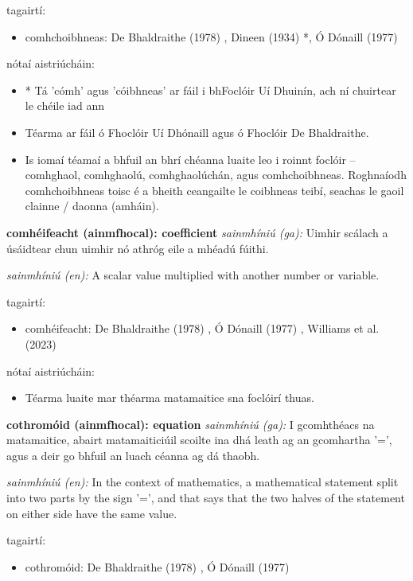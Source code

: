 \documentclass{article}
\begin{document}
tagairtí:
\begin{itemize}
	\item comhchoibhneas: De Bhaldraithe (1978) \cite{de-bhaldraithe}, Dineen (1934) \cite{dineen}*, Ó Dónaill (1977) \cite{odonaill}
\end{itemize}

nótaí aistriúcháin:
\begin{itemize}
	\item * Tá 'cómh' agus 'cóibhneas' ar fáil i bhFoclóir Uí Dhuinín, ach ní chuirtear le chéile iad ann
	\item Téarma ar fáil ó Fhoclóir Uí Dhónaill agus ó Fhoclóir De Bhaldraithe.
	\item Is iomaí téamaí a bhfuil an bhrí chéanna luaite leo i roinnt foclóir -- comhghaol, comhghaolú, comhghaolúchán, agus comhchoibhneas. Roghnaíodh comhchoibhneas toisc é a bheith ceangailte le coibhneas teibí, seachas le gaoil clainne / daonna (amháin).
\end{itemize}


\textbf{comhéifeacht (ainmfhocal): coefficient}
\textit{sainmhíniú (ga):} Uimhir scálach a úsáidtear chun uimhir nó athróg eile a mhéadú fúithi.

\textit{sainmhíniú (en):} A scalar value multiplied with another number or variable.

tagairtí:
\begin{itemize}
	\item comhéifeacht: De Bhaldraithe (1978) \cite{de-bhaldraithe}, Ó Dónaill (1977) \cite{odonaill}, Williams et al. (2023) \cite{storchiste}
\end{itemize}

nótaí aistriúcháin:
\begin{itemize}
	\item Téarma luaite mar théarma matamaitice sna foclóirí thuas.
\end{itemize}


\textbf{cothromóid (ainmfhocal): equation}
\textit{sainmhíniú (ga):} I gcomhthéacs na matamaitice, abairt matamaiticiúil scoilte ina dhá leath ag an gcomhartha '=', agus a deir go bhfuil an luach céanna ag dá thaobh.

\textit{sainmhíniú (en):} In the context of mathematics, a mathematical statement split into two parts by the sign '=', and that says that the two halves of the statement on either side have the same value.

tagairtí:
\begin{itemize}
	\item cothromóid: De Bhaldraithe (1978) \cite{de-bhaldraithe}, Ó Dónaill (1977) \cite{odonaill}
\end{itemize}
\end{document}
